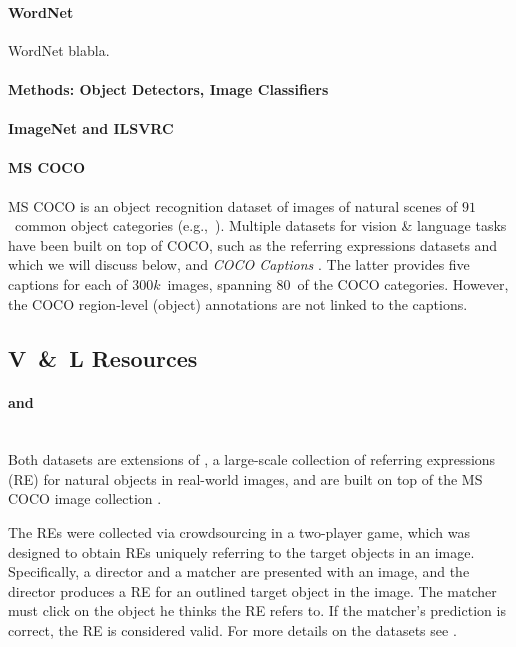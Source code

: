 \paragraph{WordNet}
WordNet \cite{fellbaum1998wordnet} blabla. 

\paragraph{Methods: Object Detectors, Image Classifiers} 

\paragraph{ImageNet and ILSVRC}


\paragraph{MS COCO} \cite{mscoco}
MS COCO is an object recognition dataset of images of natural scenes of $91$~common object categories (e.g.,~). 
Multiple datasets for vision \& language tasks have been built on top of COCO, such as the referring expressions datasets  and  which we will discuss below, and \textsl{COCO Captions} \cite{chen2015cococaptions}.  
The latter provides five captions for each of  $300k$~images, spanning $80$~of the COCO categories.  
However, the COCO region-level (object) annotations are not linked to the captions.
\subsection{V\ \&\ L Resources}

\paragraph{ and }~\\ 
Both datasets are extensions of \cite{Kazemzadeh2014}, a large-scale collection of referring expressions (RE) for natural objects in real-world images, and are built on top of the MS COCO image collection \cite{mscoco}. 

The REs were collected via crowdsourcing in a two-player game, which was designed to obtain REs uniquely referring to the target objects in an image. 
Specifically, a director and a matcher are presented with an image, and the director produces a RE for an outlined target object in the image. 
The matcher must click on the object he thinks the RE refers to. 
If the matcher's prediction is correct, the RE is considered valid. 
For more details on the datasets see \cite{Yu2016}.

